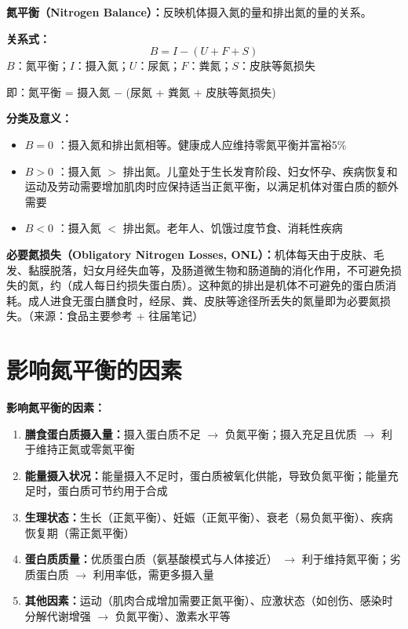 \begin{keybox}
\textbf{氮平衡（Nitrogen Balance）\difficulty：}反映机体摄入氮的量和排出氮的量的关系。

\textbf{关系式：}
\[B = I - (U + F + S)\]
$B$：氮平衡；$I$：摄入氮；$U$：尿氮；$F$：粪氮；$S$：皮肤等氮损失

即：氮平衡 = 摄入氮 $-$ (尿氮 + 粪氮 + 皮肤等氮损失)

\textbf{分类及意义：}
\begin{itemize}[leftmargin=*]
    \item $B=0$ ：摄入氮和排出氮相等。健康成人应维持零氮平衡并富裕5\%
    \item $B>0$ ：摄入氮 $>$ 排出氮。儿童处于生长发育阶段、妇女怀孕、疾病恢复和运动及劳动需要增加肌肉时应保持适当正氮平衡，以满足机体对蛋白质的额外需要
    \item $B<0$ ：摄入氮 $<$ 排出氮。老年人、饥饿过度节食、消耗性疾病
\end{itemize}

\textbf{必要氮损失（Obligatory Nitrogen Losses, ONL）\difficulty：}机体每天由于皮肤、毛发、黏膜脱落，妇女月经失血等，及肠道微生物和肠道酶的消化作用，不可避免损失的氮，约（成人每日约损失蛋白质）。这种氮的排出是机体不可避免的蛋白质消耗。成人进食无蛋白膳食时，经尿、粪、皮肤等途径所丢失的氮量即为必要氮损失。（来源：食品主要参考 + 往届笔记）
\end{keybox}

\section{影响氮平衡的因素}

\begin{defbox}
\textbf{影响氮平衡的因素：}
\begin{enumerate}[leftmargin=*]
    \item \textbf{膳食蛋白质摄入量：}摄入蛋白质不足 $\rightarrow$ 负氮平衡；摄入充足且优质 $\rightarrow$ 利于维持正氮或零氮平衡
    \item \textbf{能量摄入状况：}能量摄入不足时，蛋白质被氧化供能，导致负氮平衡；能量充足时，蛋白质可节约用于合成
    \item \textbf{生理状态：}生长（正氮平衡）、妊娠（正氮平衡）、衰老（易负氮平衡）、疾病恢复期（需正氮平衡）
    \item \textbf{蛋白质质量：}优质蛋白质（氨基酸模式与人体接近） $\rightarrow$ 利于维持氮平衡；劣质蛋白质 $\rightarrow$ 利用率低，需更多摄入量
    \item \textbf{其他因素：}运动（肌肉合成增加需要正氮平衡）、应激状态（如创伤、感染时分解代谢增强 $\rightarrow$ 负氮平衡）、激素水平等
\end{enumerate}
\end{defbox}

